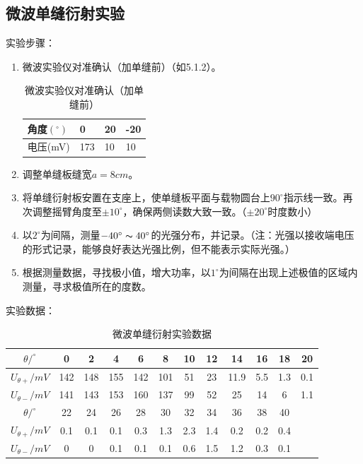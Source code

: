 \documentclass[11pt]{article}
\begin{document}
\subsection{微波单缝衍射实验}
\noindent 实验步骤：
\begin{enumerate}
    \item 微波实验仪对准确认（加单缝前）（如5.1.2）。
    \begin{table}[H]
        \centering
        \caption{微波实验仪对准确认（加单缝前）}
        \begin{tabularx}{0.5\textwidth}{|X|X|X|X|}\hline
            角度$(^\circ)$  &  0  &  20  &  -20  \\\hline
            电压(mV)  &  173  &  10  &  10  \\\hline
        \end{tabularx}  
    \end{table}
    \item 调整单缝板缝宽$a=8cm$。
    \item 将单缝衍射板安置在支座上，使单缝板平面与载物圆台上$90^\circ$指示线一致。再次调整摇臂角度至$\pm10^\circ$，确保两侧读数大致一致。（$\pm20^\circ$时度数小）
    \item 以$2^\circ$为间隔，测量$-40^\circ\thicksim 40^\circ$的光强分布，并记录。（注：光强以接收端电压的形式记录，能够良好表达光强比例，但不能表示实际光强。）
    \item 根据测量数据，寻找极小值，增大功率，以$1^\circ$为间隔在出现上述极值的区域内测量，寻求极值所在的度数。
\end{enumerate}
\noindent 实验数据：
\begin{table}[!ht]
    \centering
    \caption{微波单缝衍射实验数据}
    \begin{tabular}{|c|c|c|c|c|c|c|c|c|c|c|c|}
    \hline
        $\theta /^\circ$ & 0 & 2 & 4 & 6 & 8 & 10 & 12 & 14 & 16 & 18 & 20 \\ \hline
        $U_{\theta +}/mV$ & 142 & 148 & 155 & 142 & 101 & 51 & 23 & 11.9 & 5.5 & 1.3 & 0.1 \\ \hline
        $U_{\theta -}/mV$ & 141 & 143 & 153 & 160 & 137 & 99 & 52 & 25 & 14 & 6 & 1.1 \\ \hline
        $\theta /^\circ$ & 22 & 24 & 26 & 28 & 30 & 32 & 34 & 36 & 38 & 40 & ~ \\ \hline
        $U_{\theta +}/mV$ & 0.1 & 0.1 & 0.1 & 0.3 & 1.3 & 2.3 & 1.4 & 0.2 & 0.2 & 0.4 & ~ \\ \hline
        $U_{\theta -}/mV$ & 0 & 0 & 0.1 & 0.1 & 0.1 & 0.6 & 1.5 & 1.2 & 0.3 & 0.1 & ~\\ \hline
    \end{tabular}
\end{table}
\end{document}
